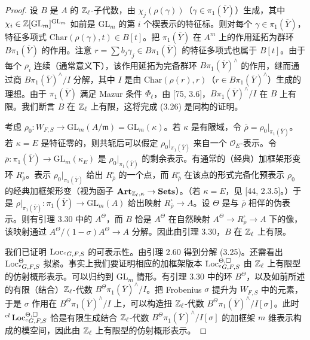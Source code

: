 \begin{proof}
设 $B$ 是 $A$ 的 $\mathbb{Z}_{\ell}$-子代数，由 $\chi_j(\rho(\gamma))$（$\gamma\in\pi_1(\overline Y)$）生成，其中 $\chi_i\in\mathbb{Z}[\mathrm{GL}_m]^{\mathrm{GL}_m}$ 如前是 $\mathrm{GL}_m$ 的第 $i$ 个楔表示的特征标。则对每个 $\gamma\in\pi_1(\overline Y)$，特征多项式 $\mathrm{Char}(\rho(\gamma),t)\in B[t]$。把 $\pi_1(\overline Y)$ 在 $A^{m}$ 上的作用延拓为群环 $B\pi_1(\overline Y)$ 的作用。注意 $r=\sum b_j\gamma_j\in B\pi_1(\overline Y)$ 的特征多项式也属于 $B[t]$。由于每个 $\rho_i$ 连续（通常意义下），该作用延拓为完备群环 $B\pi_1(\overline Y)^{\wedge}$ 的作用，继而通过商 $B\pi_1(\overline Y)^{\wedge}/I$ 分解，其中 $I$ 是由 $\mathrm{Char}(\rho(r),r)$（$r\in B\pi_1(\overline Y)^{\wedge}$）生成的理想。由于 $\pi_1(\overline Y)$ 满足 Mazur 条件 $\Phi_{\ell}$，由 [75, 3.6]，$B\pi_1(\overline Y)^{\wedge}/I$ 在 $B$ 上有限。我们断言 $B$ 在 $\mathbb{Z}_{\ell}$ 上有限，这将完成 (3.26) 是同构的证明。

考虑 $\rho_0:W_{F,S}\to\mathrm{GL}_m(A/\mathfrak m)=\mathrm{GL}_m(\kappa)$。若 $\kappa$ 是有限域，令 $\bar\rho=\rho_0|_{\pi_1(\overline Y)}$。若 $\kappa=E$ 是特征零的，则共轭后可以假定 $\rho_0|_{\pi_1(\overline Y)}$ 来自一个 $\mathcal O_E$-表示。令 $\bar\rho:\pi_1(\overline Y)\to\mathrm{GL}_m(\kappa_E)$ 是 $\rho_0|_{\pi_1(\overline Y)}$ 的剩余表示。有通常的（经典）加框架形变环 $R^{\square}_{\bar\rho}$。表示 $\rho_0|_{\pi_1(\overline Y)}$ 给出 $R^{\square}_{\bar\rho}$ 的一个点，而
$R^{\square}_{\bar\rho}$ 在该点的形式完备化预表示 $\rho_0$ 的经典加框架形变（视为函子 $\mathbf{Art}_{\mathbb{Z}_{\ell},\kappa}\to\mathbf{Sets}$）。（若 $\kappa=E$，见 [44, 2.3.5]。）于是 $\rho|_{\pi_1(\overline Y)}:\pi_1(\overline Y)\to\mathrm{GL}_m(A)$ 给出映射 $R^{\square}_{\bar\rho}\to A$。设 $\Theta$ 是与 $\bar\rho$ 相伴的伪表示。则有引理 3.30 中的 $A^{\Theta}$，而 $B$ 恰是 $A^{\Theta}$ 在自然映射 $A^{\Theta}\to R^{\square}_{\bar\rho}\to A$ 下的像，该映射通过 $A^{\Theta}/(1-\sigma)A^{\Theta}\to A$ 分解。因此由引理 3.30，$B$ 在 $\mathbb{Z}_{\ell}$ 上有限。

我们已证明 $\operatorname{Loc}_{{}^{c}G,F,S}$ 的可表示性。由引理 2.60 得到分解 (3.25)。还需看出 $\operatorname{Loc}^{\Theta}_{{}^{c}G,F,S}$ 拟紧。事实上我们要证明相应的加框架版本 $\operatorname{Loc}^{\Theta,\square}_{{}^{c}G,F,S}$ 由 $\mathbb{Z}_{\ell}$ 上有限型的仿射概形表示。可以归约到 $\mathrm{GL}_m$ 情形。有引理 3.30 中的环 $B^{\Theta}$，以及如前所述的有限（结合）$\mathbb{Z}_{\ell}$-代数 $B^{\Theta}\pi_1(\overline Y)^{\wedge}/I$。把 Frobenius $\sigma$ 提升为 $W_{F,S}$ 中的元素，于是 $\sigma$ 作用在 $B^{\Theta}\pi_1(\overline Y)^{\wedge}/I$ 上，可以构造扭 $\mathbb{Z}_{\ell}$-代数 $B^{\Theta}\pi_1(\overline Y)^{\wedge}/I[\sigma]$。此时 ${}^{cl}\operatorname{Loc}^{\Theta,\square}_{{}^{c}G,F,S}$ 恰是有限生成结合 $\mathbb{Z}_{\ell}$-代数 $B^{\Theta}\pi_1(\overline Y)^{\wedge}/I[\sigma]$ 的加框架 $m$ 维表示构成的模空间，因此由 $\mathbb{Z}_{\ell}$ 上有限型的仿射概形表示。
\end{proof}

